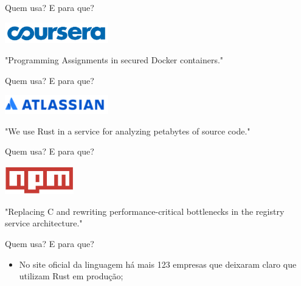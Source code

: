 \documentclass[aspectratio=169]{beamer}
\begin{document}
\begin{frame}[noframenumbering]{Quem usa? E para que?}
	\begin{center}
		\includegraphics[width=4.5cm]{imgs/coursera.png}	
		
		"Programming Assignments in secured Docker containers."
	\end{center}
\end{frame}

\begin{frame}[noframenumbering]{Quem usa? E para que?}
	\begin{center}
		\includegraphics[width=4.5cm]{imgs/atlassian.png}	
		
		"We use Rust in a service for analyzing petabytes of source code."
	\end{center}
\end{frame}

\begin{frame}[noframenumbering]{Quem usa? E para que?}
	\begin{center}
		\includegraphics[width=3.0cm]{imgs/npm.jpeg}	
		
		"Replacing C and rewriting performance-critical bottlenecks in the registry service architecture."
	\end{center}
\end{frame}

\begin{frame}{Quem usa? E para que?}
	\begin{itemize}
		\item No site oficial da linguagem há mais 123 empresas que deixaram claro que utilizam Rust em produção;
	\end{itemize}
\end{frame}
\end{document}
